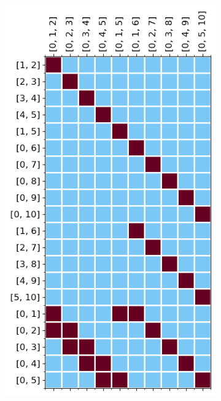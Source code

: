 \begin{figure}[H]
\noindent%
\centering%
\begin{subfigure}[l]{0.49\textwidth}
\begin{center}
\includegraphics[scale=0.6]{ConnectingMorsePersistence/Figures/Reduction/default.png}
\end{center}
\end{subfigure}
\begin{subfigure}[r]{0.49\textwidth}
\begin{center}

\end{center}
\end{subfigure}
\end{figure}
